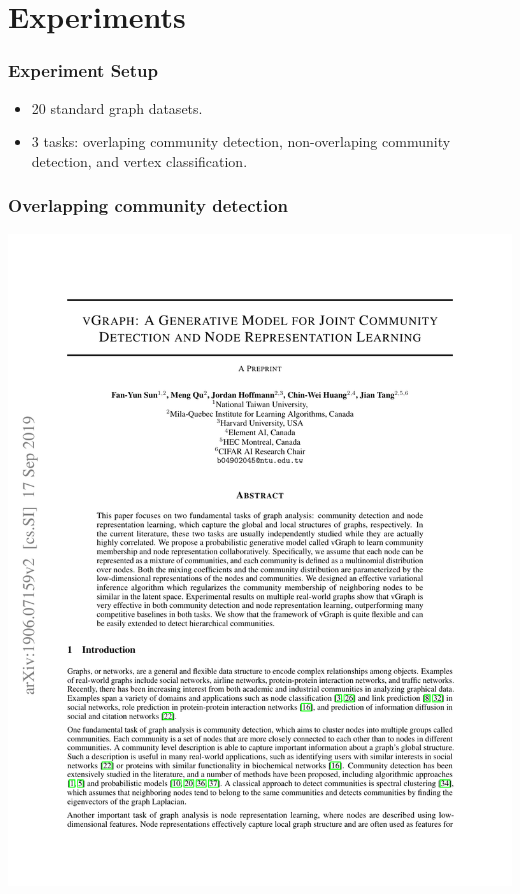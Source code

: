 \documentclass[12pt,aspectratio=169]{beamer}
\begin{document}
    \section{Experiments}

    \begin{frame}
        \frametitle{Experiment Setup}

        \begin{itemize}
            \setlength{\itemsep}{1.4em}
            \item 20 standard graph datasets.
            \item 3 tasks: overlaping community detection, non-overlaping community detection, and vertex classification.
        \end{itemize}
    \end{frame}

    \begin{frame}
        \frametitle{Overlapping community detection}

        \centering
        \includegraphics[page=6,trim=2.5cm 19.5cm 2.5cm 2cm,clip,scale=.8]{vGraph.pdf}
    \end{frame}
\end{document}

